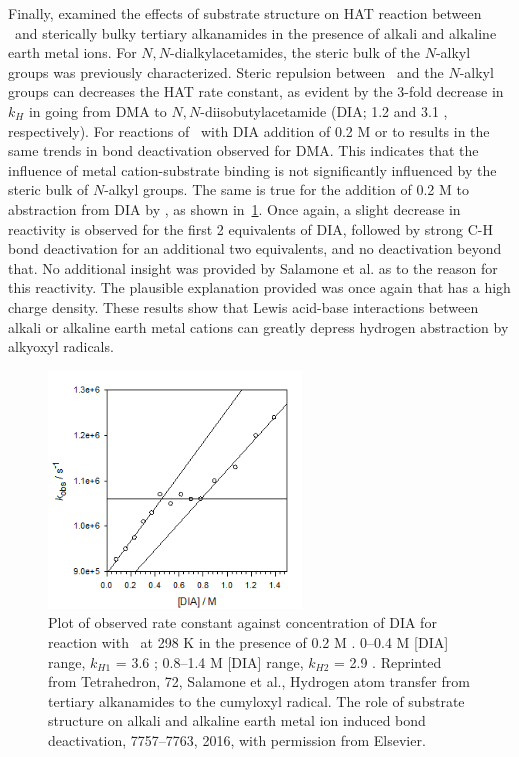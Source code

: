 Finally, \citet{Salamone2016} examined the effects of substrate structure on HAT
reaction between \cumo\ and sterically bulky tertiary alkanamides in the
presence of alkali and alkaline earth metal ions. For $N,N$-dialkylacetamides,
the steric bulk of the $N$-alkyl groups was previously
characterized.\cite{Salamone2014} Steric repulsion between \cumo\ and the
$N$-alkyl groups can decreases the HAT rate constant, as evident by the 3-fold
decrease in $k_H$ in going from DMA to $N,N$-diisobutylacetamide (DIA; 1.2
and 3.1 \Ms, respectively). For reactions of \cumo\ with DIA addition of
0.2 M  or  to results in the same trends in 
bond deactivation observed for DMA. This indicates that the influence of metal
cation-substrate binding is not significantly influenced by the steric bulk of
$N$-alkyl groups.  The same is true for the addition of 0.2 M  to
abstraction from DIA by \cumo, as shown in~\ref{fig:k-dia-mg}. Once again, a
slight decrease in reactivity is observed for the first 2 equivalents of DIA,
followed by strong C-H bond deactivation for an additional two equivalents, and
no deactivation beyond that. No additional insight was provided by Salamone et
al. as to the reason for this reactivity. The plausible explanation provided was
once again that  has a high charge density. These results show that
Lewis acid-base interactions between alkali or alkaline earth metal cations can
greatly depress hydrogen abstraction by alkyoxyl radicals.

\begin{figure}[!htbp]
  \includegraphics[width=0.6\textwidth]{figures/exptdia-mg.png}
  \caption[Plot of observed rate constant against concentration of DIA for
  reaction with \cumo\ at 298 K in the presence of 0.2 M .]{Plot
	  of observed rate constant against concentration of DIA for reaction
	  with \cumo\ at 298 K in the presence of 0.2 M . 0--0.4
	  M [DIA] range, $k_{H1}$ = 3.6 \Ms; 0.8--1.4 M [DIA] range,
	  $k_{H2}$ = 2.9 \Ms.  Reprinted from Tetrahedron, 72, Salamone et
  al., Hydrogen atom transfer from tertiary alkanamides to the cumyloxyl
  radical. The role of substrate structure on alkali and alkaline earth metal
  ion induced  bond deactivation, 7757--7763, 2016, with permission
  from Elsevier.} \label{fig:k-dia-mg}
\end{figure}

